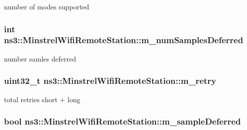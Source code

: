 number of modes supported 

\subsubsection[{\texorpdfstring{m\+\_\+num\+Samples\+Deferred}{m_numSamplesDeferred}}]{\setlength{\rightskip}{0pt plus 5cm}int ns3\+::\+Minstrel\+Wifi\+Remote\+Station\+::m\+\_\+num\+Samples\+Deferred}\hypertarget{structns3_1_1MinstrelWifiRemoteStation_a73797674efeaddba87dd052940125293}{}\label{structns3_1_1MinstrelWifiRemoteStation_a73797674efeaddba87dd052940125293}


number samles deferred 

\subsubsection[{\texorpdfstring{m\+\_\+retry}{m_retry}}]{\setlength{\rightskip}{0pt plus 5cm}uint32\+\_\+t ns3\+::\+Minstrel\+Wifi\+Remote\+Station\+::m\+\_\+retry}\hypertarget{structns3_1_1MinstrelWifiRemoteStation_a9f80718a2af71d31897ae0e7e6c50ada}{}\label{structns3_1_1MinstrelWifiRemoteStation_a9f80718a2af71d31897ae0e7e6c50ada}


total retries short + long 

\subsubsection[{\texorpdfstring{m\+\_\+sample\+Deferred}{m_sampleDeferred}}]{\setlength{\rightskip}{0pt plus 5cm}bool ns3\+::\+Minstrel\+Wifi\+Remote\+Station\+::m\+\_\+sample\+Deferred}\hypertarget{structns3_1_1MinstrelWifiRemoteStation_ab36a5b37c62921da5aa7b58de4b05ca7}{}\label{structns3_1_1MinstrelWifiRemoteStation_ab36a5b37c62921da5aa7b58de4b05ca7}



